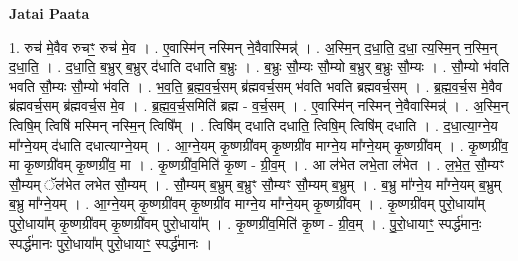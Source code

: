 \documentclass[17pt]{extarticle}
\begin{document}
\textbf{Jatai Paata} \newline

1. रुच॑ मे॒वैव रुचꣳ॒॒ रुच॑ मे॒व । . ए॒वास्मि॑न् नस्मिन् ने॒वैवास्मिन्न्॑ । . अ॒स्मि॒न् द॒धा॒ति॒ द॒धा॒ त्य॒स्मि॒न् न॒स्मि॒न् द॒धा॒ति॒ । . द॒धा॒ति॒ ब॒भ्रुर् ब॒भ्रुर् द॑धाति दधाति ब॒भ्रुः । . ब॒भ्रुः सौ॒म्यः सौ॒म्यो ब॒भ्रुर् ब॒भ्रुः सौ॒म्यः । . सौ॒म्यो भ॑वति भवति सौ॒म्यः सौ॒म्यो भ॑वति । . भ॒व॒ति॒ ब्र॒ह्म॒व॒र्च॒सम् ब्र॑ह्मवर्च॒सम् भ॑वति भवति ब्रह्मवर्च॒सम् । . ब्र॒ह्म॒व॒र्च॒स मे॒वैव ब्र॑ह्मवर्च॒सम् ब्र॑ह्मवर्च॒स मे॒व । . ब्र॒ह्म॒व॒र्च॒समिति॑ ब्रह्म - व॒र्च॒सम् । . ए॒वास्मि॑न् नस्मिन् ने॒वैवास्मिन्न्॑ । . अ॒स्मि॒न् त्विषि॒म् त्विषि॑ मस्मिन् नस्मि॒न् त्विषि᳚म् । . त्विषि॑म् दधाति दधाति॒ त्विषि॒म् त्विषि॑म् दधाति । . द॒धा॒त्या॒ग्ने॒य मा᳚ग्ने॒यम् द॑धाति दधात्याग्ने॒यम् । . आ॒ग्ने॒यम् कृ॒ष्णग्री॑वम् कृ॒ष्णग्री॑व माग्ने॒य मा᳚ग्ने॒यम् कृ॒ष्णग्री॑वम् । . कृ॒ष्णग्री॑व॒ मा कृ॒ष्णग्री॑वम् कृ॒ष्णग्री॑व॒ मा । . कृ॒ष्णग्री॑व॒मिति॑ कृ॒ष्ण - ग्री॒व॒म् । . आ ल॑भेत लभे॒ता ल॑भेत । . ल॒भे॒त॒ सौ॒म्यꣳ सौ॒म्यम् ॅल॑भेत लभेत सौ॒म्यम् । . सौ॒म्यम् ब॒भ्रुम् ब॒भ्रुꣳ सौ॒म्यꣳ सौ॒म्यम् ब॒भ्रुम् । . ब॒भ्रु मा᳚ग्ने॒य मा᳚ग्ने॒यम् ब॒भ्रुम् ब॒भ्रु मा᳚ग्ने॒यम् । . आ॒ग्ने॒यम् कृ॒ष्णग्री॑वम् कृ॒ष्णग्री॑व माग्ने॒य मा᳚ग्ने॒यम् कृ॒ष्णग्री॑वम् । . कृ॒ष्णग्री॑वम् पुरो॒धाया᳚म् पुरो॒धाया᳚म् कृ॒ष्णग्री॑वम् कृ॒ष्णग्री॑वम् पुरो॒धाया᳚म् । . कृ॒ष्णग्री॑व॒मिति॑ कृ॒ष्ण - ग्री॒व॒म् । . पु॒रो॒धायाꣳ॒॒ स्पर्द्ध॑मानः॒ स्पर्द्ध॑मानः पुरो॒धाया᳚म् पुरो॒धायाꣳ॒॒ स्पर्द्ध॑मानः । \newline
\end{document}
